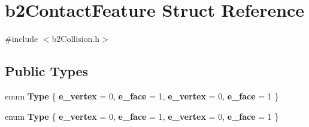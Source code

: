 \hypertarget{structb2ContactFeature}{}\section{b2\+Contact\+Feature Struct Reference}
\label{structb2ContactFeature}


{\ttfamily \#include $<$b2\+Collision.\+h$>$}

\subsection*{Public Types}
\begin{DoxyCompactItemize}
\item 
\mbox{\label{structb2ContactFeature_a29fb037bd886215d2ddd6e68148ac154}} 
enum {\bfseries Type} \{ {\bfseries e\+\_\+vertex} = 0, 
{\bfseries e\+\_\+face} = 1, 
{\bfseries e\+\_\+vertex} = 0, 
{\bfseries e\+\_\+face} = 1
 \}
\item 
\mbox{\label{structb2ContactFeature_a29fb037bd886215d2ddd6e68148ac154}} 
enum {\bfseries Type} \{ {\bfseries e\+\_\+vertex} = 0, 
{\bfseries e\+\_\+face} = 1, 
{\bfseries e\+\_\+vertex} = 0, 
{\bfseries e\+\_\+face} = 1
 \}
\end{DoxyCompactItemize}
